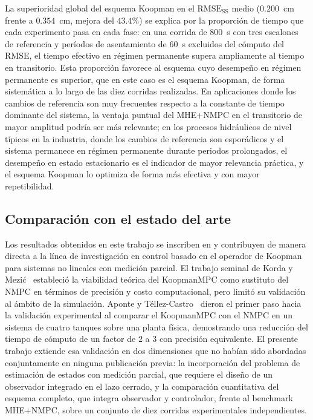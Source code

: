\documentclass[12pt,letterpaper]{article}
\begin{document}
La superioridad global del esquema Koopman en el 
$\mathrm{RMSE}_{\mathrm{SS}}$ medio ($0.200$~cm frente a 
$0.354$~cm, mejora del $43.4\%$) se explica por la proporción de 
tiempo que cada experimento pasa en cada fase: en una corrida de 
$800$~s con tres escalones de referencia y períodos de 
asentamiento de $60$~s excluidos del cómputo del RMSE, el tiempo 
efectivo en régimen permanente supera ampliamente al tiempo en 
transitorio. Esta proporción favorece al esquema cuyo desempeño en 
régimen permanente es superior, que en este caso es el esquema 
Koopman, de forma sistemática a lo largo de las diez corridas 
realizadas. En aplicaciones donde los cambios de referencia son 
muy frecuentes respecto a la constante de tiempo dominante del 
sistema, la ventaja puntual del MHE+NMPC en el transitorio de 
mayor amplitud podría ser más relevante; en los procesos 
hidráulicos de nivel típicos en la industria, donde los cambios de 
referencia son esporádicos y el sistema permanece en régimen 
permanente durante periodos prolongados, el desempeño en estado 
estacionario es el indicador de mayor relevancia práctica, y el 
esquema Koopman lo optimiza de forma más efectiva y con mayor 
repetibilidad.

\subsection{Comparación con el estado del arte}
\label{sec:analisis_arte}

Los resultados obtenidos en este trabajo se inscriben en y 
contribuyen de manera directa a la línea de investigación en control 
basado en el operador de Koopman para sistemas no lineales con 
medición parcial. El trabajo seminal de Korda y 
Mezić~\cite{korda2018} estableció la viabilidad teórica del 
KoopmanMPC como sustituto del NMPC en términos de precisión y 
costo computacional, pero limitó su validación al ámbito de la 
simulación. Aponte y Téllez-Castro~\cite{aponte2024} dieron el 
primer paso hacia la validación experimental al comparar el 
KoopmanMPC con el NMPC en un sistema de cuatro tanques sobre una 
planta física, demostrando una reducción del tiempo de cómputo de 
un factor de $2$ a $3$ con precisión equivalente. El presente 
trabajo extiende esa validación en dos dimensiones que no habían 
sido abordadas conjuntamente en ninguna publicación previa: la 
incorporación del problema de estimación de estados con medición 
parcial, que requiere el diseño de un observador integrado en el
lazo cerrado, y la comparación cuantitativa del esquema completo,
que integra observador y controlador, frente al benchmark MHE+NMPC,
sobre un conjunto de diez corridas experimentales independientes.
\end{document}
